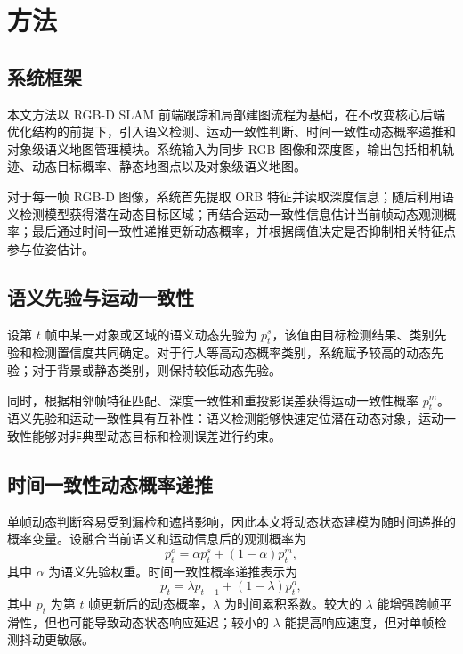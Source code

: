 \section{方法}

\subsection{系统框架}

本文方法以 RGB-D SLAM 前端跟踪和局部建图流程为基础，在不改变核心后端优化结构的前提下，引入语义检测、运动一致性判断、时间一致性动态概率递推和对象级语义地图管理模块。系统输入为同步 RGB 图像和深度图，输出包括相机轨迹、动态目标概率、静态地图点以及对象级语义地图。

对于每一帧 RGB-D 图像，系统首先提取 ORB 特征并读取深度信息；随后利用语义检测模型获得潜在动态目标区域；再结合运动一致性信息估计当前帧动态观测概率；最后通过时间一致性递推更新动态概率，并根据阈值决定是否抑制相关特征点参与位姿估计。

\subsection{语义先验与运动一致性}

设第 \(t\) 帧中某一对象或区域的语义动态先验为 \(p_t^s\)，该值由目标检测结果、类别先验和检测置信度共同确定。对于行人等高动态概率类别，系统赋予较高的动态先验；对于背景或静态类别，则保持较低动态先验。

同时，根据相邻帧特征匹配、深度一致性和重投影误差获得运动一致性概率 \(p_t^m\)。语义先验和运动一致性具有互补性：语义检测能够快速定位潜在动态对象，运动一致性能够对非典型动态目标和检测误差进行约束。

\subsection{时间一致性动态概率递推}

单帧动态判断容易受到漏检和遮挡影响，因此本文将动态状态建模为随时间递推的概率变量。设融合当前语义和运动信息后的观测概率为
\begin{equation}
p_t^o=\alpha p_t^s+(1-\alpha)p_t^m ,
\label{eq:observation_probability}
\end{equation}
其中 \(\alpha\) 为语义先验权重。时间一致性概率递推表示为
\begin{equation}
p_t=\lambda p_{t-1}+(1-\lambda)p_t^o ,
\label{eq:temporal_recursion}
\end{equation}
其中 \(p_t\) 为第 \(t\) 帧更新后的动态概率，\(\lambda\) 为时间累积系数。较大的 \(\lambda\) 能增强跨帧平滑性，但也可能导致动态状态响应延迟；较小的 \(\lambda\) 能提高响应速度，但对单帧检测抖动更敏感。

